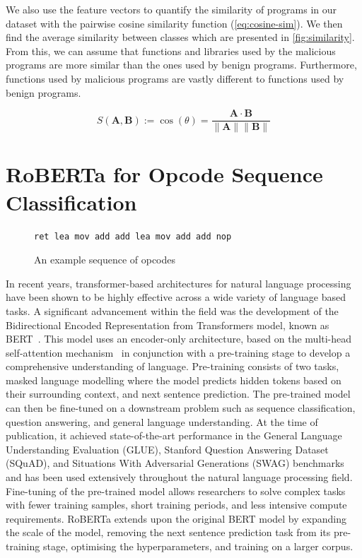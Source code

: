 \documentclass[main.tex]{subfiles}
\begin{document}
We also use the feature vectors to quantify the similarity of programs in our dataset with the pairwise cosine similarity function (\cref{eq:cosine-sim}). We then find the average similarity between classes which are presented in \cref{fig:similarity}. From this, we can assume that functions and libraries used by the malicious programs are more similar than the ones used by benign programs. Furthermore, functions used by malicious programs are vastly different to functions used by benign programs. 

\begin{equation}
    S\left(\mathbf{A},\mathbf{B}\right) := \cos\left(\theta\right)=\frac{\mathbf {A} \cdot \mathbf {B}}{\|\mathbf {A} \|\|\mathbf {B} \|}\label{eq:cosine-sim}
\end{equation}

\section{RoBERTa for Opcode Sequence Classification}

\begin{figure}[h]
    \centering
    \begin{BVerbatim}
ret lea mov add add lea mov add add nop
    \end{BVerbatim}
    \caption{An example sequence of opcodes}
    \label{fig:opcode-sequence}
\end{figure}

\noindent
In recent years, transformer-based architectures for natural language processing have been shown to be highly effective across a wide variety of language based tasks. A significant advancement within the field was the development of the Bidirectional Encoded Representation from Transformers model, known as BERT~\citep{devlinBERTPretrainingDeep2019a}. This model uses an encoder-only architecture, based on the multi-head self-attention mechanism~\citep{vaswaniAttentionAllYou2023a} in conjunction with a pre-training stage to develop a comprehensive understanding of language. Pre-training consists of two tasks, masked language modelling where the model predicts hidden tokens based on their surrounding context, and next sentence prediction. The pre-trained model can then be fine-tuned on a downstream problem such as sequence classification, question answering, and general language understanding. At the time of publication, it achieved state-of-the-art performance in the General Language Understanding Evaluation (GLUE), Stanford Question Answering Dataset (SQuAD), and Situations With Adversarial Generations (SWAG) benchmarks and has been used extensively throughout the natural language processing field. Fine-tuning of the pre-trained model allows researchers to solve complex tasks with fewer training samples, short training periods, and less intensive compute requirements. RoBERTa extends upon the original BERT model by expanding the scale of the model, removing the next sentence prediction task from its pre-training stage, optimising the hyperparameters, and training on a larger corpus. 
\end{document}
